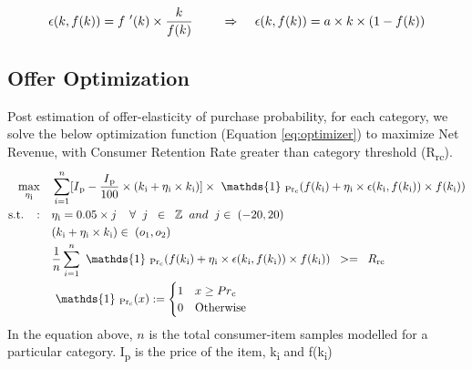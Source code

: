  \begin{equation}
    \epsilon(k,f(k)) = f\textsuperscript{'}(k) \times\frac{k}{f(k)} \;\;\;\; \;\;\;\;
    \Rightarrow \;\;\;\;\epsilon(k,f(k)) = a\times k\times (1 - f(k))
    \label{eq:offerelasticity}
  \end{equation}

\subsection{Offer Optimization}
Post estimation of offer-elasticity of purchase probability, for each category, we solve the
below optimization function (Equation \ref{eq:optimizer}) to maximize Net Revenue,
with Consumer Retention Rate greater than category threshold (R\textsubscript{rc}).
\begin{equation}
\begin{aligned}
\max_{\eta\textsubscript{i}} \quad & 
\sum_{i=1}^{n} [I\textsubscript{p} - \frac{I\textsubscript{p}}{100} \times 
    (k\textsubscript{i} + \eta\textsubscript{i}\times k\textsubscript{i})]
    \times
    \ \mathds{1} \ \textsubscript{Pr\textsubscript{c}}(f(k\textsubscript{i}) + \eta\textsubscript{i}\times 
    \epsilon(k\textsubscript{i},f(k\textsubscript{i}))\times f(k\textsubscript{i})) \\
\textrm{s.t.} \;\;\;: \quad & \eta\textsubscript{i} = 0.05\times j \;\;\;\;  
\forall \;\;  j \;\; \in \;\; \mathbb{Z}  \;\;and\;\; j \in \; (-20, 20) \\
& (k\textsubscript{i} + \eta\textsubscript{i}\times k\textsubscript{i}) \in \; (o\textsubscript{1}, o\textsubscript{2})\\
& \frac{1}{n} \sum_{i=1}^{n} \ \mathds{1} \ \textsubscript{Pr\textsubscript{c}}(f(k\textsubscript{i}) + 
    \eta\textsubscript{i}\times 
    \epsilon(k\textsubscript{i},f(k\textsubscript{i}))\times f(k\textsubscript{i})) \;\; >= \;\; R\textsubscript{rc} \\
&\ \mathds{1} \ \textsubscript{Pr\textsubscript{c}}(x) :=
        \begin{cases}
          1 & x \geq Pr\textsubscript{c}\\
          0 & \text{Otherwise}
        \end{cases}
\end{aligned}
\label{eq:optimizer}
\end{equation}
In the equation above, $n$ is the total consumer-item samples modelled for a particular category.
I\textsubscript{p} is the price of the item, k\textsubscript{i} and f(k\textsubscript{i}) 
